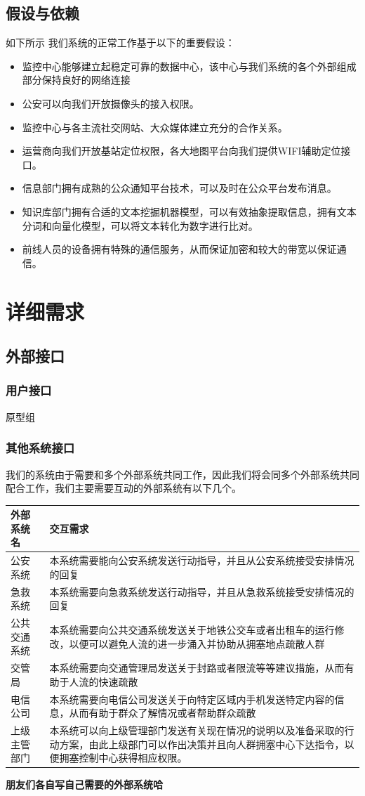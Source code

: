 \documentclass{ctexrep}
\begin{document}
\section{假设与依赖}
如下所示 我们系统的正常工作基于以下的重要假设：
\begin{itemize}
\item 监控中心能够建立起稳定可靠的数据中心，该中心与我们系统的各个外部组成部分保持良好的网络连接
\item 公安可以向我们开放摄像头的接入权限。
\item 监控中心与各主流社交网站、大众媒体建立充分的合作关系。
\item 运营商向我们开放基站定位权限，各大地图平台向我们提供WIFI辅助定位接口。
\item 信息部门拥有成熟的公众通知平台技术，可以及时在公众平台发布消息。
\item 知识库部门拥有合适的文本挖掘机器模型，可以有效抽象提取信息，拥有文本分词和向量化模型，可以将文本转化为数字进行比对。
\item 前线人员的设备拥有特殊的通信服务，从而保证加密和较大的带宽以保证通信。
\end{itemize}

\chapter{详细需求}
\section{外部接口}
\subsection{用户接口}
原型组
\subsection{其他系统接口}
我们的系统由于需要和多个外部系统共同工作，因此我们将会同多个外部系统共同配合工作，我们主要需要互动的外部系统有以下几个。
\begin{longtable}{p{2cm}|p{10cm}}
\hline
外部系统名 & 交互需求 \\
\hline
\hline
公安系统 & 本系统需要能向公安系统发送行动指导，并且从公安系统接受安排情况的回复 \\
\hline
急救系统 & 本系统需要向急救系统发送行动指导，并且从急救系统接受安排情况的回复 \\
\hline
公共交通系统 & 本系统需要向公共交通系统发送关于地铁公交车或者出租车的运行修改，以便可以避免人流的进一步涌入并协助从拥塞地点疏散人群 \\
\hline
交管局 & 本系统需要向交通管理局发送关于封路或者限流等等建议措施，从而有助于人流的快速疏散\\
\hline
电信公司 & 本系统需要向电信公司发送关于向特定区域内手机发送特定内容的信息，从而有助于群众了解情况或者帮助群众疏散 \\
\hline
上级主管部门 & 本系统可以向上级管理部门发送有关现在情况的说明以及准备采取的行动方案，由此上级部门可以作出决策并且向人群拥塞中心下达指令，以便拥塞控制中心获得相应权限。\\
\hline
\end{longtable}
\textbf{朋友们各自写自己需要的外部系统哈}
\end{document}
